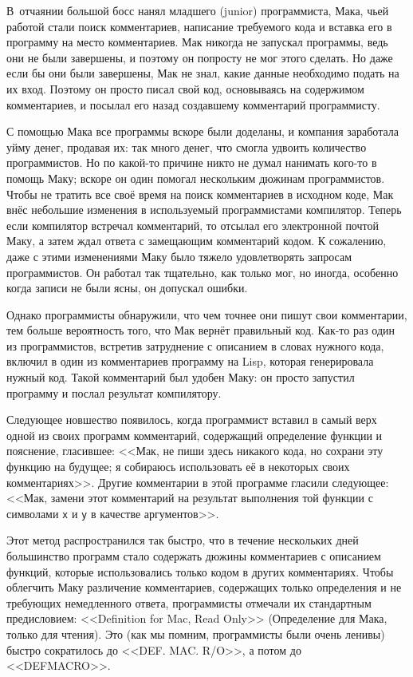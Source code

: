 В~отчаянии большой босс нанял младшего (junior) программиста, Мака, чьей работой стали
поиск комментариев, написание требуемого кода и вставка его в программу на место
комментариев. Мак никогда не запускал программы, ведь они не были завершены, и поэтому он
попросту не мог этого сделать. Но даже если бы они были завершены, Мак не знал, какие
данные необходимо подать на их вход. Поэтому он просто писал свой код, основываясь на
содержимом комментариев, и посылал его назад создавшему комментарий программисту.

С помощью Мака все программы вскоре были доделаны, и компания заработала уйму денег,
продавая их: так много денег, что смогла удвоить количество программистов. Но по какой-то
причине никто не думал нанимать кого-то в помощь Маку; вскоре он один помогал нескольким
дюжинам программистов. Чтобы не тратить все своё время на поиск комментариев в исходном
коде, Мак внёс небольшие изменения в используемый программистами компилятор. Теперь если
компилятор встречал комментарий, то отсылал его электронной почтой Маку, а затем ждал
ответа с замещающим комментарий кодом. К сожалению, даже с этими изменениями Маку было
тяжело удовлетворять запросам программистов. Он работал так тщательно, как только мог, но
иногда, особенно когда записи не были ясны, он допускал ошибки.

Однако программисты обнаружили, что чем точнее они пишут свои комментарии, тем больше
вероятность того, что Мак вернёт правильный код. Как-то раз один из программистов,
встретив затруднение с описанием в словах нужного кода, включил в один из комментариев
программу на Lisp, которая генерировала нужный код. Такой комментарий был удобен Маку: он
просто запустил программу и послал результат компилятору.

Следующее новшество появилось, когда программист вставил в самый верх одной из своих
программ комментарий, содержащий определение функции и пояснение, гласившее: <<Мак, не пиши
здесь никакого кода, но сохрани эту функцию на будущее; я собираюсь использовать её в
некоторых своих комментариях>>. Другие комментарии в этой программе гласили следующее:
<<Мак, замени этот комментарий на результат выполнения той функции с символами \lstinline{x} и
\lstinline{y} в качестве аргументов>>.

Этот метод распространился так быстро, что в течение нескольких дней большинство программ
стало содержать дюжины комментариев с описанием функций, которые использовались только
кодом в других комментариях. Чтобы облегчить Маку различение комментариев, содержащих
только определения и не требующих немедленного ответа, программисты отмечали их
стандартным предисловием: <<Definition for Mac, Read Only>> (Определение для Мака, только
для чтения). Это (как мы помним, программисты были очень ленивы) быстро сократилось до
<<DEF. MAC. R/O>>, а потом до <<DEFMACRO>>.

